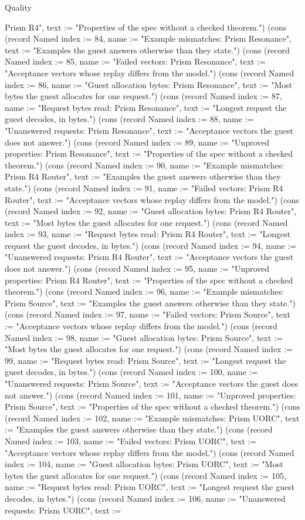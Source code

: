 \begin{lexlean}{Quality}
\begin{semanticmodule}
{Prism R4", text := "Properties of the spec without a checked theorem."}) (cons (record Named {index := 84, name := "Example mismatches: Prism Resonance", text := "Examples the guest answers otherwise than they state."}) (cons (record Named {index := 85, name := "Failed vectors: Prism Resonance", text := "Acceptance vectors whose replay differs from the model."}) (cons (record Named {index := 86, name := "Guest allocation bytes: Prism Resonance", text := "Most bytes the guest allocates for one request."}) (cons (record Named {index := 87, name := "Request bytes read: Prism Resonance", text := "Longest request the guest decodes, in bytes."}) (cons (record Named {index := 88, name := "Unanswered requests: Prism Resonance", text := "Acceptance vectors the guest does not answer."}) (cons (record Named {index := 89, name := "Unproved properties: Prism Resonance", text := "Properties of the spec without a checked theorem."}) (cons (record Named {index := 90, name := "Example mismatches: Prism R4 Router", text := "Examples the guest answers otherwise than they state."}) (cons (record Named {index := 91, name := "Failed vectors: Prism R4 Router", text := "Acceptance vectors whose replay differs from the model."}) (cons (record Named {index := 92, name := "Guest allocation bytes: Prism R4 Router", text := "Most bytes the guest allocates for one request."}) (cons (record Named {index := 93, name := "Request bytes read: Prism R4 Router", text := "Longest request the guest decodes, in bytes."}) (cons (record Named {index := 94, name := "Unanswered requests: Prism R4 Router", text := "Acceptance vectors the guest does not answer."}) (cons (record Named {index := 95, name := "Unproved properties: Prism R4 Router", text := "Properties of the spec without a checked theorem."}) (cons (record Named {index := 96, name := "Example mismatches: Prism Source", text := "Examples the guest answers otherwise than they state."}) (cons (record Named {index := 97, name := "Failed vectors: Prism Source", text := "Acceptance vectors whose replay differs from the model."}) (cons (record Named {index := 98, name := "Guest allocation bytes: Prism Source", text := "Most bytes the guest allocates for one request."}) (cons (record Named {index := 99, name := "Request bytes read: Prism Source", text := "Longest request the guest decodes, in bytes."}) (cons (record Named {index := 100, name := "Unanswered requests: Prism Source", text := "Acceptance vectors the guest does not answer."}) (cons (record Named {index := 101, name := "Unproved properties: Prism Source", text := "Properties of the spec without a checked theorem."}) (cons (record Named {index := 102, name := "Example mismatches: Prism UORC", text := "Examples the guest answers otherwise than they state."}) (cons (record Named {index := 103, name := "Failed vectors: Prism UORC", text := "Acceptance vectors whose replay differs from the model."}) (cons (record Named {index := 104, name := "Guest allocation bytes: Prism UORC", text := "Most bytes the guest allocates for one request."}) (cons (record Named {index := 105, name := "Request bytes read: Prism UORC", text := "Longest request the guest decodes, in bytes."}) (cons (record Named {index := 106, name := "Unanswered requests: Prism UORC", text := }
\end{semanticmodule}
\end{lexlean}
